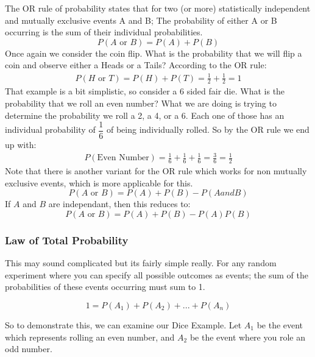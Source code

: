 \documentclass{article}
\begin{document}
The OR rule of probability states that for two (or more) statistically independent and mutually exclusive events A and B; The probability of either A or B occurring is the sum of their individual probabilities.
\begin{equation}
P(A \text{ or } B) = P(A)+P(B)
\end{equation}
Once again we consider the coin flip. What is the probability that we will flip a coin and observe either a Heads or a Tails? According to the OR rule:
\begin{align*}
P(H \text{ or } T) = P(H)+P(T) = \tfrac{1}{2}+\tfrac{1}{2} = 1
\end{align*}
That example is a bit simplistic, so consider a 6 sided fair die. What is the probability that we roll an even number? What we are doing is trying to determine the probability we roll a 2, a 4, or a 6. Each one of those has an individual probability of $\dfrac{1}{6}$ of being individually rolled. So by the OR rule we end up with:
\begin{align*}
P(\text{Even Number}) = \tfrac{1}{6}+\tfrac{1}{6}+\tfrac{1}{6} = \tfrac{3}{6} = \tfrac{1}{2}
\end{align*}
Note that there is another variant for the OR rule which works for non mutually exclusive events, which is more applicable for this.
\begin{equation}
P(A \text{ or } B) = P(A)+P(B) - P(A and B)
\end{equation}
If $A$ and $B$ are independant, then this reduces to:
\begin{equation}
P(A \text{ or } B) = P(A)+P(B) - P(A)P(B)
\end{equation}

\subsubsection{Law of Total Probability}

This may sound complicated but its fairly simple really. For any random experiment where you can specify all possible outcomes as events; the sum of the probabilities of these events occurring must sum to 1.

\begin{equation}
1 = P(A_1) + P(A_2) + ... + P(A_n)
\end{equation}

So to demonstrate this, we can examine our Dice Example. Let $A_1$ be the event which represents rolling an even number, and $A_2$ be the event where you role an odd number.
\end{document}

